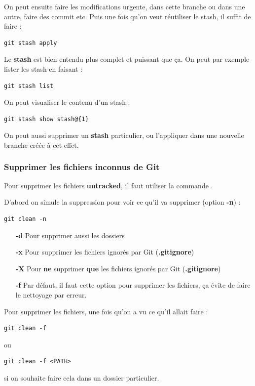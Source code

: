 \documentclass[a4paper,twoside]{article}
\begin{document}
On peut ensuite faire les modifications urgente, dans cette branche ou dans une autre, faire des commit etc. Puis une fois qu'on veut réutiliser le stash, il suffit de faire : 
\begin{verbatim}
git stash apply
\end{verbatim}

\bigskip

Le \textbf{stash} est bien entendu plus complet et puissant que ça. On peut par exemple lister les stash en faisant :
\begin{verbatim}
git stash list
\end{verbatim}

On peut visualiser le contenu d'un stash : 
\begin{verbatim}
git stash show stash@{1}
\end{verbatim}

On peut aussi supprimer un \textbf{stash} particulier, ou l'appliquer dans une nouvelle branche créée à cet effet.

\subsubsection{Supprimer les fichiers inconnus de Git}
Pour supprimer les fichiers \textbf{untracked}, il faut utiliser la commande . 

D'abord on simule la suppression pour voir ce qu'il va supprimer (option \textbf{-n}) :
\begin{verbatim}
git clean -n
\end{verbatim}

\begin{itemize}
\item[\textbf{-d}] Pour supprimer aussi les dossiers
\item[\textbf{-x}] Pour supprimer les fichiers ignorés par Git (\textbf{.gitignore})
\item[\textbf{-X}] Pour \textbf{ne} supprimer \textbf{que} les fichiers ignorés par Git (\textbf{.gitignore})
\item[\textbf{-f}] Par défaut, il faut cette option pour supprimer les fichiers, ça évite de faire le nettoyage par erreur.
\end{itemize}

Pour supprimer les fichiers, une fois qu'on a vu ce qu'il allait faire :
\begin{verbatim}
git clean -f
\end{verbatim}
ou
\begin{verbatim}
git clean -f <PATH>
\end{verbatim}
si on souhaite faire cela dans un dossier particulier.
\end{document}
